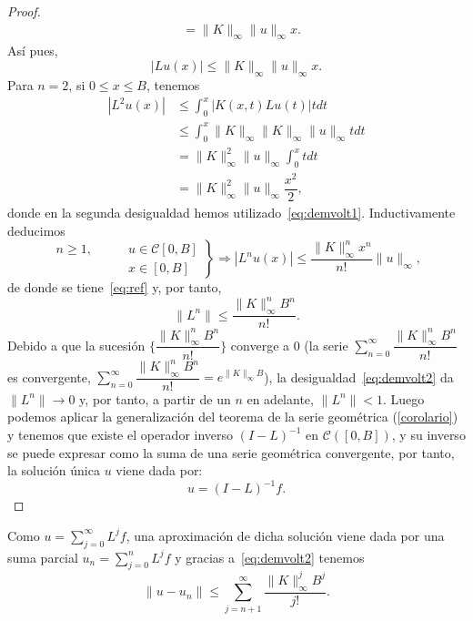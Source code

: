 \begin{proof}
\begin{equation}
\begin{split}
			& = \lVert K \rVert_\infty \lVert u \rVert_\infty x.
		\end{split}
	\end{equation}
	Así pues,
	\begin{equation}\label{eq:demvolt1}
		|Lu(x)| \leqslant \lVert K \rVert_\infty \lVert u \rVert_\infty x.
	\end{equation}
	Para $n = 2$, si $0 \leqslant x \leqslant B$, tenemos
	\begin{equation}
		\begin{split}
			|L^2u(x)| & \leqslant \int_{0}^{x}|K(x,t)Lu(t)|tdt \\
			& \leqslant \int_{0}^{x} \lVert K \rVert_\infty \lVert K \rVert_\infty \lVert u \rVert_\infty tdt\\
			& =  \lVert K \rVert_\infty^2 \lVert u \rVert_\infty \int_{0}^{x}tdt \\
			& = \lVert K \rVert_\infty^2 \lVert u \rVert_\infty \dfrac{x^2}{2},
		\end{split}
	\end{equation}
	donde en la segunda desigualdad hemos utilizado~\eqref{eq:demvolt1}. Inductivamente deducimos
	\begin{equation}
		\left.\begin{split}
			n \geqslant 1, \qquad & u \in \mathcal{C}[0,B]\\
			& x \in [0,B]
		\end{split}\right\rbrace \Rightarrow |L^nu(x)| \leqslant \dfrac{\lVert K \rVert_\infty^nx^n}{n!}\lVert u \rVert_\infty,
	\end{equation}
	de donde se tiene~\eqref{eq:ref} y, por tanto, 
	\begin{equation}\label{eq:demvolt2}
		\lVert L^n \rVert \leqslant \dfrac{\lVert K \rVert_\infty^nB^n}{n!}.
	\end{equation}
	Debido a que la sucesión $\{\dfrac{\lVert K \rVert_\infty^nB^n}{n!}\}$ converge a $0$ (la serie $\displaystyle \sum_{n=0}^{\infty}\dfrac{\lVert K \rVert_\infty^nB^n}{n!}$ es convergente, $\displaystyle \sum_{n=0}^{\infty}\dfrac{\lVert K \rVert_\infty^nB^n}{n!} = e^{\lVert K \rVert_\infty B}$), la desigualdad~\eqref{eq:demvolt2} da $\lVert L^n \rVert \rightarrow 0$ y, por tanto, a partir de un $n$ en adelante, $\lVert L^n \rVert < 1$.
	Luego podemos aplicar la generalización del teorema de la serie geométrica (\autoref{corolario}) y tenemos que existe el operador inverso $(I-L)^{-1}$ en $\mathcal{C}([0,B])$, y su inverso se puede expresar como la suma de una serie geométrica convergente, por tanto,  la solución única $u$ viene dada por:
	\begin{equation}
		u = (I-L)^{-1}f.
	\end{equation}
\end{proof}
Como $u = \displaystyle \sum_{j=0}^{\infty} L^jf$, una aproximación de dicha solución viene dada por una suma parcial $u_n = \displaystyle \sum_{j=0}^{n}L^jf$ y gracias a~\eqref{eq:demvolt2} tenemos
\begin{equation}
	\lVert u-u_n \rVert \leqslant \sum_{j=n+1}^{\infty}\dfrac{\lVert K \rVert_\infty^j B^j}{j!}.
\end{equation}
